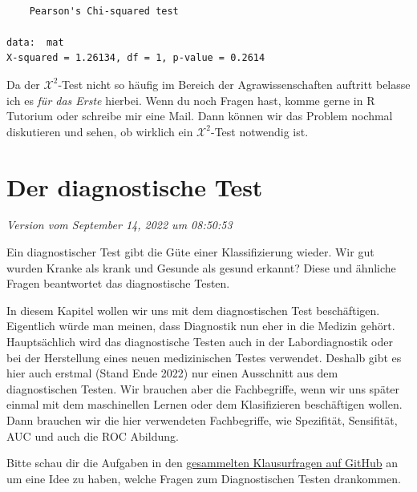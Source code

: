 \documentclass[
  letterpaper,
]{scrbook}
\begin{document}
\begin{verbatim}

    Pearson's Chi-squared test

data:  mat
X-squared = 1.26134, df = 1, p-value = 0.2614
\end{verbatim}

Da der \(\mathcal{X}^2\)-Test nicht so häufig im Bereich der
Agrawissenschaften auftritt belasse ich es \emph{für das Erste} hierbei.
Wenn du noch Fragen hast, komme gerne in R Tutorium oder schreibe mir
eine Mail. Dann können wir das Problem nochmal diskutieren und sehen, ob
wirklich ein \(\mathcal{X}^2\)-Test notwendig ist.

\hypertarget{sec-test-diag}{%
\chapter{Der diagnostische Test}\label{sec-test-diag}}

\emph{Version vom September 14, 2022 um 08:50:53}

\begin{tcolorbox}[enhanced jigsaw, coltitle=black, titlerule=0mm, bottomrule=.15mm, opacityback=0, opacitybacktitle=0.6, leftrule=.75mm, title=\textcolor{quarto-callout-note-color}{\faInfo}\hspace{0.5em}{Was macht der diagnostische Test?}, toprule=.15mm, bottomtitle=1mm, toptitle=1mm, left=2mm, breakable, arc=.35mm, colback=white, rightrule=.15mm, colbacktitle=quarto-callout-note-color!10!white, colframe=quarto-callout-note-color-frame]
Ein diagnostischer Test gibt die Güte einer Klassifizierung wieder. Wir
gut wurden Kranke als krank und Gesunde als gesund erkannt? Diese und
ähnliche Fragen beantwortet das diagnostische Testen.
\end{tcolorbox}

In diesem Kapitel wollen wir uns mit dem diagnostischen Test
beschäftigen. Eigentlich würde man meinen, dass Diagnostik nun eher in
die Medizin gehört. Hauptsächlich wird das diagnostische Testen auch in
der Labordiagnostik oder bei der Herstellung eines neuen medizinischen
Testes verwendet. Deshalb gibt es hier auch erstmal (Stand Ende 2022)
nur einen Ausschnitt aus dem diagnostischen Testen. Wir brauchen aber
die Fachbegriffe, wenn wir uns später einmal mit dem maschinellen Lernen
oder dem Klasifizieren beschäftigen wollen. Dann brauchen wir die hier
verwendeten Fachbegriffe, wie Spezifität, Sensifität, AUC und auch die
ROC Abildung.

\begin{tcolorbox}[enhanced jigsaw, coltitle=black, titlerule=0mm, bottomrule=.15mm, opacityback=0, opacitybacktitle=0.6, leftrule=.75mm, title=\textcolor{quarto-callout-caution-color}{\faFire}\hspace{0.5em}{Ein Wort zur Klausur}, toprule=.15mm, bottomtitle=1mm, toptitle=1mm, left=2mm, breakable, arc=.35mm, colback=white, rightrule=.15mm, colbacktitle=quarto-callout-caution-color!10!white, colframe=quarto-callout-caution-color-frame]
Bitte schau dir die Aufgaben in den
\href{https://github.com/jkruppa/teaching/tree/main/Klausur}{gesammelten
Klausurfragen auf GitHub} an um eine Idee zu haben, welche Fragen zum
Diagnostischen Testen drankommen.
\end{tcolorbox}
\end{document}
